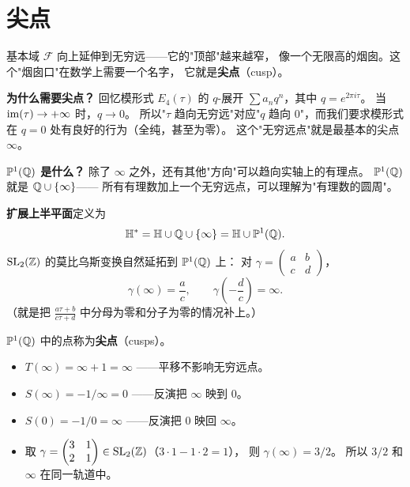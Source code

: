 \section{尖点}
\label{sec:cusps}

基本域 $\mathcal{F}$ 向上延伸到无穷远——它的"顶部"越来越窄，
像一个无限高的烟囱。这个"烟囱口"在数学上需要一个名字，
它就是\textbf{尖点}（cusp）。

\textbf{为什么需要尖点？}
回忆模形式 $E_4(\tau)$ 的 $q$-展开 $\sum a_n q^n$，其中 $q = e^{2\pi i\tau}$。
当 $\operatorname{im}(\tau) \to +\infty$ 时，$q \to 0$。
所以"$\tau$ 趋向无穷远"对应"$q$ 趋向 $0$"，而我们要求模形式在 $q = 0$
处有良好的行为（全纯，甚至为零）。
这个"无穷远点"就是最基本的尖点 $\infty$。

\textbf{$\mathbb{P}^1(\mathbb{Q})$ 是什么？}
除了 $\infty$ 之外，还有其他"方向"可以趋向实轴上的有理点。
$\mathbb{P}^1(\mathbb{Q})$ 就是 $\mathbb{Q} \cup \{\infty\}$——
所有有理数加上一个无穷远点，可以理解为"有理数的圆周"。

\begin{definition}[扩展上半平面与尖点]
\label{def:cusps}
\textbf{扩展上半平面}定义为
\[
  \mathbb{H}^* = \mathbb{H} \cup \mathbb{Q} \cup \{\infty\} = \mathbb{H} \cup \mathbb{P}^1(\mathbb{Q}).
\]
$\mathrm{SL}_2(\mathbb{Z})$ 的莫比乌斯变换自然延拓到 $\mathbb{P}^1(\mathbb{Q})$ 上：
对 $\gamma = \begin{pmatrix} a & b \\ c & d \end{pmatrix}$，
\[
  \gamma(\infty) = \frac{a}{c}, \qquad
  \gamma\!\left(-\frac{d}{c}\right) = \infty.
\]
（就是把 $\frac{a\tau + b}{c\tau + d}$ 中分母为零和分子为零的情况补上。）

$\mathbb{P}^1(\mathbb{Q})$ 中的点称为\textbf{尖点}（cusps）。
\end{definition}

\begin{example}[具体的尖点变换]
\label{ex:cusp-action}
\leavevmode
\begin{itemize}
  \item $T(\infty) = \infty + 1 = \infty$
    ——平移不影响无穷远点。
  \item $S(\infty) = -1/\infty = 0$
    ——反演把 $\infty$ 映到 $0$。
  \item $S(0) = -1/0 = \infty$
    ——反演把 $0$ 映回 $\infty$。
  \item 取 $\gamma = \begin{pmatrix} 3 & 1 \\ 2 & 1 \end{pmatrix}
    \in \mathrm{SL}_2(\mathbb{Z})$（$3 \cdot 1 - 1 \cdot 2 = 1$），
    则 $\gamma(\infty) = 3/2$。
    所以 $3/2$ 和 $\infty$ 在同一轨道中。
\end{itemize}
\end{example}

